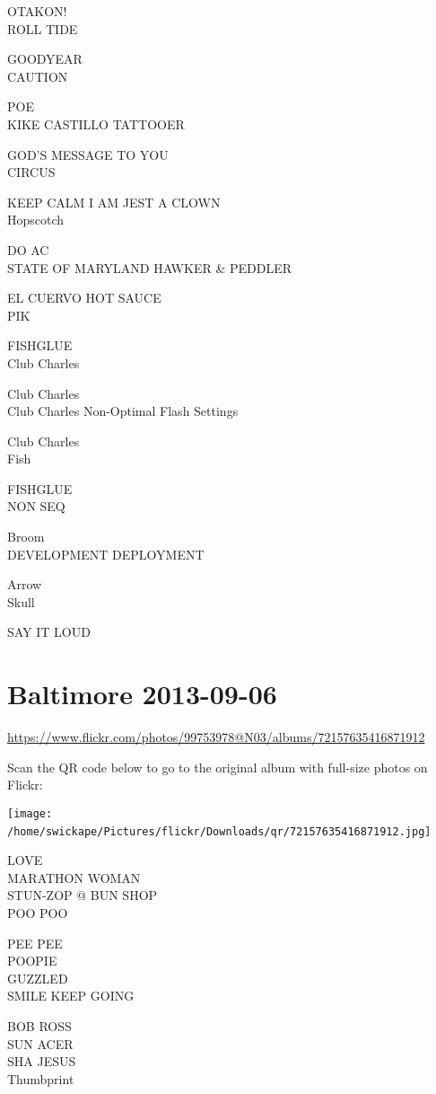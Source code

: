 \documentclass[10pt,letterpaper]{article}
\begin{document}
OTAKON!\\
ROLL TIDE

GOODYEAR\\
CAUTION

POE\\
KIKE CASTILLO TATTOOER

GOD'S MESSAGE TO YOU\\
CIRCUS

KEEP CALM I AM JEST A CLOWN\\
Hopscotch

DO AC\\
STATE OF MARYLAND HAWKER \& PEDDLER

EL CUERVO HOT SAUCE\\
PIK

FISHGLUE\\
Club Charles

Club Charles\\
Club Charles Non{-}Optimal Flash Settings

Club Charles\\
Fish

FISHGLUE\\
NON SEQ

Broom\\
DEVELOPMENT DEPLOYMENT

Arrow\\
Skull

SAY IT LOUD
\

\section*{Baltimore 2013-09-06}

\url{https://www.flickr.com/photos/99753978@N03/albums/72157635416871912}

Scan the QR code below to go to the original album with full-size photos on Flickr:

\texttt{[image: /home/swickape/Pictures/flickr/Downloads/qr/72157635416871912.jpg]}
\

LOVE\\
MARATHON WOMAN\\
STUN{-}ZOP @ BUN SHOP\\
POO POO

PEE PEE\\
POOPIE\\
GUZZLED\\
SMILE KEEP GOING

BOB ROSS\\
SUN ACER\\
SHA JESUS\\
Thumbprint
\end{document}
